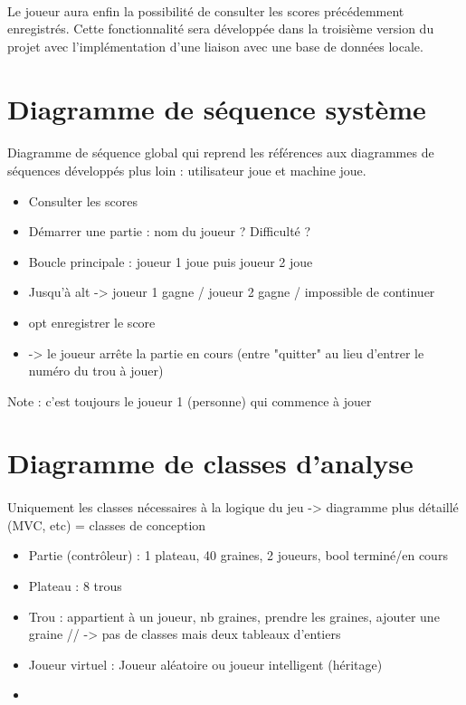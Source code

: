 \documentclass{article}
\begin{document}
    \paragraph{}
    Le joueur aura enfin la possibilité de consulter les scores précédemment enregistrés. Cette fonctionnalité sera développée dans la troisième version du projet avec l'implémentation d'une liaison avec une base de données locale.


    \newpage
    \section{Diagramme de séquence système}
    
    \paragraph{}
    Diagramme de séquence global qui reprend les références aux diagrammes de séquences développés plus loin : utilisateur joue et machine joue.


    \begin{itemize}
        \item Consulter les scores
        \item Démarrer une partie : nom du joueur ? Difficulté ?
        \item Boucle principale : joueur 1 joue puis joueur 2 joue
        \item Jusqu'à alt -> joueur 1 gagne / joueur 2 gagne / impossible de continuer
        \item opt enregistrer le score
        \item -> le joueur arrête la partie en cours (entre "quitter" au lieu d'entrer le numéro du trou à jouer)
    \end{itemize}
    Note : c'est toujours le joueur 1 (personne) qui commence à jouer


    \newpage
    \section{Diagramme de classes d'analyse}

    \paragraph{}
    Uniquement les classes nécessaires à la logique du jeu -> diagramme plus détaillé (MVC, etc) = classes de conception

    \begin{itemize}
        \item Partie (contrôleur) : 1 plateau, 40 graines, 2 joueurs, bool terminé/en cours
        \item Plateau : 8 trous
        \item Trou : appartient à un joueur, nb graines, prendre les graines, ajouter une graine // -> pas de classes mais deux tableaux d'entiers
        \item Joueur virtuel : Joueur aléatoire ou joueur intelligent (héritage)
        \item 
    \end{itemize}
\end{document}
